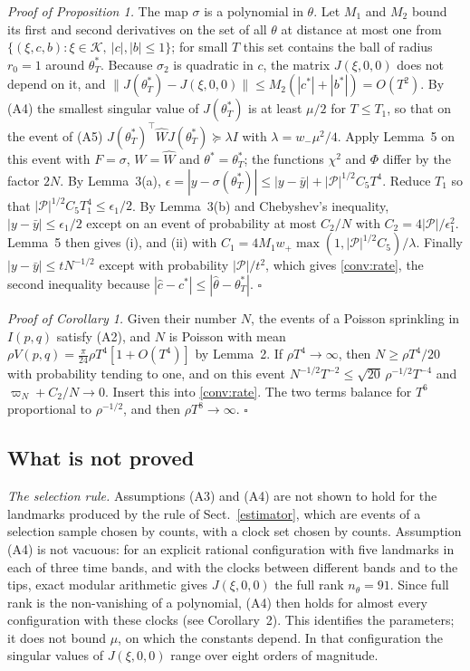 \medskip
\noindent\emph{Proof of Proposition 1.} The map $\sigma$ is a polynomial in
$\theta$. Let $M_1$ and $M_2$ bound its first and second derivatives on the
set of all $\theta$ at distance at most one from
$\{(\xi,c,b):\xi\in\mathcal K,\ |c|,|b|\le1\}$; for small $T$ this set
contains the ball of radius $r_0=1$ around $\theta^*_T$. Because $\sigma_2$
is quadratic in $c$, the matrix $J(\xi,0,0)$ does not depend on it, and
$\|J(\theta^*_T)-J(\xi,0,0)\|\le M_2(|c^*|+|b^*|)=O(T^2)$. By (A4) the
smallest singular value of $J(\theta^*_T)$ is at least $\mu/2$ for
$T\le T_1$, so that on the event of (A5)
$J(\theta^*_T)^{\!\top}\widehat WJ(\theta^*_T)\succeq\lambda I$ with
$\lambda=w_-\mu^2/4$. Apply Lemma~5 on this event with $F=\sigma$,
$W=\widehat W$ and $\theta^*=\theta^*_T$; the functions $\chi^2$ and $\Phi$
differ by the factor $2N$. By Lemma~3(a),
$\epsilon=|y-\sigma(\theta^*_T)|\le|y-\bar y|+|\mathcal P|^{1/2}C_5T^4$.
Reduce $T_1$ so that $|\mathcal P|^{1/2}C_5T_1^4\le\epsilon_1/2$. By
Lemma~3(b) and Chebyshev's inequality, $|y-\bar y|\le\epsilon_1/2$ except
on an event of probability at most $C_2/N$ with
$C_2=4|\mathcal P|/\epsilon_1^2$. Lemma~5 then gives (i), and (ii) with
$C_1=4M_1w_+\max(1,|\mathcal P|^{1/2}C_5)/\lambda$. Finally
$|y-\bar y|\le tN^{-1/2}$ except with probability $|\mathcal P|/t^2$, which
gives \eqref{conv:rate}, the second inequality because
$|\hat c-c^*|\le|\hat\theta-\theta^*_T|$. \hfill$\square$

\medskip
\noindent\emph{Proof of Corollary 1.} Given their number $N$, the events of
a Poisson sprinkling in $I(p,q)$ satisfy (A2), and $N$ is Poisson with mean
$\rho V(p,q)=\tfrac{\pi}{24}\rho T^4[1+O(T^4)]$ by Lemma~2. If
$\rho T^4\to\infty$, then $N\ge\rho T^4/20$ with probability tending to
one, and on this event $N^{-1/2}T^{-2}\le\sqrt{20}\,\rho^{-1/2}T^{-4}$ and
$\varpi_N+C_2/N\to0$. Insert this into \eqref{conv:rate}. The two terms
balance for $T^6$ proportional to $\rho^{-1/2}$, and then
$\rho T^8\to\infty$. \hfill$\square$

\subsection{What is not proved}\label{app:open}
\emph{The selection rule.} Assumptions (A3) and (A4) are not shown to hold
for the landmarks produced by the rule of Sect.~\ref{estimator}, which are
events of a selection sample chosen by counts, with a clock set chosen by
counts. Assumption (A4) is not vacuous: for an explicit rational
configuration with five landmarks in each of three time bands, and with
the clocks between different bands and to the tips, exact modular
arithmetic gives $J(\xi,0,0)$ the full rank $n_\theta=91$. Since full rank
is the non-vanishing of a polynomial, (A4) then holds for almost every
configuration with these clocks (see Corollary~2). This identifies the
parameters; it does not bound $\mu$, on which the constants depend. In
that configuration the singular values of $J(\xi,0,0)$ range over eight
orders of magnitude.

